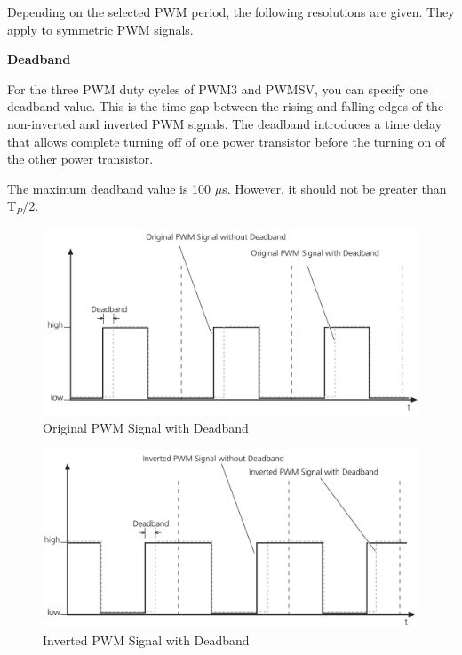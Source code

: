 Depending on the selected PWM period, the following resolutions are given. They apply to symmetric PWM signals.



\noindent \textbf{Deadband}\par

For the three PWM duty cycles of PWM3 and PWMSV, you can specify one deadband value. This is the time gap between the rising and falling edges of the non-inverted and inverted PWM signals. The deadband introduces a time delay that allows complete turning off of one power transistor before the turning on of the other power transistor.

The maximum deadband value is 100 $\mu$s. However, it should not be greater than T$_P$/2.

\begin{figure}[H]
    \centering
    \includegraphics[width=\textwidth]{Images/Original PWM Signal with Deadband.png}
    \caption{Original PWM Signal with Deadband}
    \label{Original PWM Signal with Deadband}
\end{figure}

\begin{figure}[H]
    \centering
    \includegraphics[width=\textwidth]{Images/Inverted PWM Signal with Deadband.png}
    \caption{Inverted PWM Signal with Deadband}
    \label{Inverted PWM Signal with Deadband}
\end{figure}

